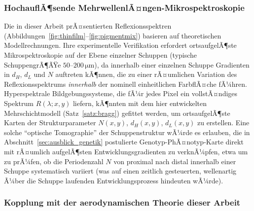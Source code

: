 ﻿\documentclass[a4paper,12pt]{article}
\theoremstyle{definition}
\begin{document}
	\subsubsection{HochauflÃ¶sende MehrwellenlÃ¤ngen-Mikrospektroskopie}

	Die in dieser Arbeit prÃ¤sentierten Reflexionsspektren
	(Abbildungen~\ref{fig:thinfilm}--\ref{fig:pigmentmix}) basieren auf
	theoretischen Modellrechnungen. Ihre experimentelle Verifikation
	erfordert ortsaufgelÃ¶ste Mikrospektroskopie auf der Ebene einzelner
	Schuppen (typische SchuppengrÃ¶ÃŸe $50$--$200\,\si{\micro\meter}$), da
	innerhalb einer einzelnen Schuppe Gradienten in $d_H$, $d_L$ und $N$
	auftreten kÃ¶nnen, die zu einer rÃ¤umlichen Variation des
	Reflexionsspektrums \emph{innerhalb} der nominell einheitlichen
	FarbflÃ¤che fÃ¼hren. Hyperspektrale Bildgebungssysteme, die fÃ¼r jedes
	Pixel ein vollstÃ¤ndiges Spektrum $R(\lambda;x,y)$ liefern, kÃ¶nnten
	mit dem hier entwickelten Mehrschichtmodell (Satz~\ref{satz:bragg})
	gefittet werden, um ortsaufgelÃ¶ste Karten der Strukturparameter
	$N(x,y)$, $d_H(x,y)$, $d_L(x,y)$ zu erstellen. Eine solche
	``optische Tomographie'' der Schuppenstruktur wÃ¼rde es erlauben, die
	in Abschnitt~\ref{sec:ausblick_genetik} postulierte
	Genotyp-PhÃ¤notyp-Karte direkt mit rÃ¤umlich aufgelÃ¶sten
	Entwicklungsgradienten zu verknÃ¼pfen, etwa um zu prÃ¼fen, ob die
	Periodenzahl $N$ von proximal nach distal innerhalb einer Schuppe
	systematisch variiert (was auf einen zeitlich gesteuerten,
	wellenartig Ã¼ber die Schuppe laufenden Entwicklungsprozess
	hindeuten wÃ¼rde).

	\subsubsection{Kopplung mit der aerodynamischen Theorie dieser Arbeit}
\end{document}
